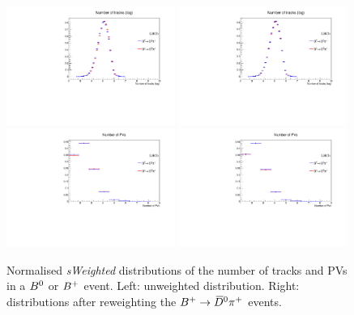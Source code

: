 \begin{figure}[t]
  \begin{center}
   \includegraphics[width=0.49\textwidth]{AA-Appdx-OSTaggers/figs/nTracks_BuVSBd_Unweighted.pdf}
   \includegraphics[width=0.49\textwidth]{AA-Appdx-OSTaggers/figs/nTracks_BuVSBd_Weighted.pdf} \\
   \includegraphics[width=0.49\textwidth]{AA-Appdx-OSTaggers/figs/nPV_BuVSBd_Unweighted.pdf}
   \includegraphics[width=0.49\textwidth]{AA-Appdx-OSTaggers/figs/nPV_BuVSBd_Weighted.pdf}\\
  \end{center}
  \vspace{-2mm}
  \caption{Normalised \emph{sWeighted} distributions of the number of tracks and PVs in a $B^0$ or $B^+$ event. Left: unweighted distribution. Right: distributions after reweighting the $B^+\rightarrow\kern 0.2em\overline{\kern -0.2em D}{}^0\pi^+$ events.}
  \label{fig:reweightingOSgb2}
\end{figure}

